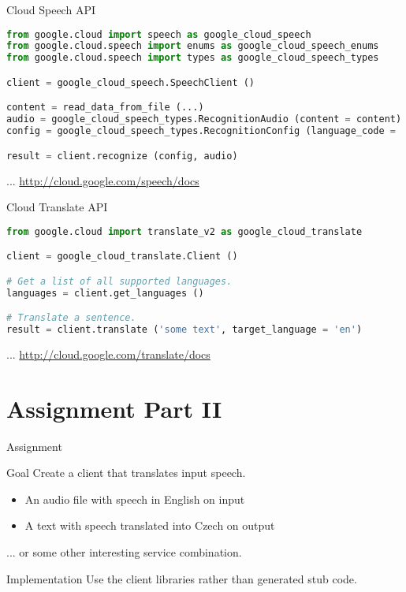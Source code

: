 \begin{frame}[fragile]{Cloud Speech API}
\begin{lstlisting}[language=python,style=mini]
from google.cloud import speech as google_cloud_speech
from google.cloud.speech import enums as google_cloud_speech_enums
from google.cloud.speech import types as google_cloud_speech_types

client = google_cloud_speech.SpeechClient ()

content = read_data_from_file (...)
audio = google_cloud_speech_types.RecognitionAudio (content = content)
config = google_cloud_speech_types.RecognitionConfig (language_code = 'en-US')

result = client.recognize (config, audio)
\end{lstlisting}
    \bigskip
    \hfill ... \url{http://cloud.google.com/speech/docs}
\end{frame}


\begin{frame}[fragile]{Cloud Translate API}
\begin{lstlisting}[language=python,style=mini]
from google.cloud import translate_v2 as google_cloud_translate

client = google_cloud_translate.Client ()

# Get a list of all supported languages.
languages = client.get_languages ()

# Translate a sentence.
result = client.translate ('some text', target_language = 'en')
\end{lstlisting}
    \bigskip
    \hfill ... \url{http://cloud.google.com/translate/docs}
\end{frame}


\section{Assignment Part II}


\begin{frame}{Assignment}
    \begin{block}{Goal}
        Create a client that translates input speech.
        \begin{itemize}
            \item An audio file with speech in English on input
            \item A text with speech translated into Czech on output
        \end{itemize}
        ... or some other interesting service combination.
    \end{block}

    \bigskip

    \begin{block}{Implementation}
        Use the client libraries rather than generated stub code.
    \end{block}
\end{frame}


